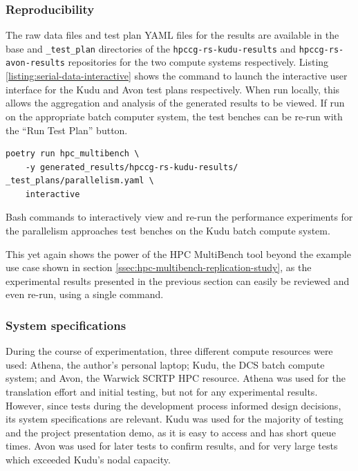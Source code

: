 \subsubsection{Reproducibility}
\label{sssec:parallelism-approaches-reproducibility}

The raw data files and test plan YAML files for the results are available in the base and \texttt{\_test\_plan} directories of the \texttt{hpccg-rs-kudu-results} and \texttt{hpccg-rs-avon-results} repositories for the two compute systems respectively. Listing \ref{listing:serial-data-interactive} shows the command to launch the interactive user interface for the Kudu and Avon test plans respectively. When run locally, this allows the aggregation and analysis of the generated results to be viewed. If run on the appropriate batch computer system, the test benches can be re-run with the ``Run Test Plan'' button.

\begin{listing}[H]
    \begin{verbatim}
poetry run hpc_multibench \
    -y generated_results/hpccg-rs-kudu-results/ _test_plans/parallelism.yaml \
    interactive
    \end{verbatim}
    \caption{Bash commands to interactively view and re-run the performance experiments for the parallelism approaches test benches on the Kudu batch compute system.}
    \label{listing:serial-data-interactive}
\end{listing}

This yet again shows the power of the HPC MultiBench tool beyond the example use case shown in section \ref{ssec:hpc-multibench-replication-study}, as the experimental results presented in the previous section can easily be reviewed and even re-run, using a single command.


\subsubsection{System specifications}
\label{sssec:system-specifications}

During the course of experimentation, three different compute resources were used: Athena, the author's personal laptop; Kudu, the DCS batch compute system; and Avon, the Warwick \acrfull{SCRTP} \acrshort{HPC} resource. Athena was used for the translation effort and initial testing, but not for any experimental results. However, since tests during the development process informed design decisions, its system specifications are relevant. Kudu was used for the majority of testing and the project presentation demo, as it is easy to access and has short queue times. Avon was used for later tests to confirm results, and for very large tests which exceeded Kudu's nodal capacity.

